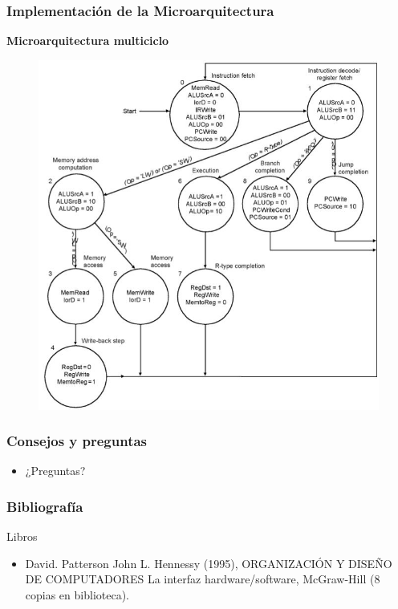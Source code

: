 \documentclass[aspectratio=169,compress]{beamer}
\begin{document}
\begin{footnotesize}
\begin{frame}
\frametitle{Implementación de la Microarquitectura}
\begin{center}\textbf{Microarquitectura multiciclo}\end{center}
\begin{figure}
\includegraphics[scale=0.3]{images/cpu-multiciclo-fsm.jpg} 
\end{figure}
\end{frame}




\begin{frame}
 \frametitle{Consejos y preguntas}
\begin{center}
\begin{itemize}
\item  ¿Preguntas?
\end{itemize}
\end{center}
\end{frame}


\begin{frame}
 \frametitle{Bibliografía}
Libros
\begin{itemize}
\item David. Patterson John L. Hennessy (1995), ORGANIZACIÓN Y DISEÑO DE COMPUTADORES La interfaz hardware/software, McGraw-Hill (8 copias en biblioteca).
\end{itemize}
\end{frame}

\end{footnotesize}
\end{document}

